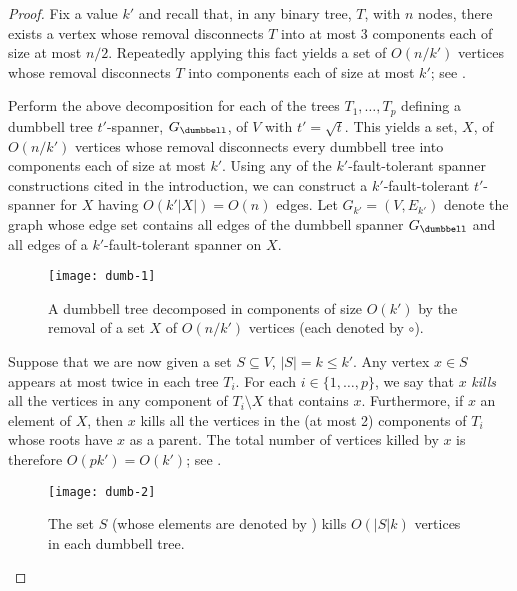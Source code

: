 \documentclass{patmorin}
\begin{document}
\begin{proof} 
  Fix a value $k'$ and recall that, in any binary tree, $T$, with $n$
  nodes, there exists a vertex whose removal disconnects $T$ into at
  most 3 components each of size at most $n/2$.  Repeatedly applying this
  fact yields a set of $O(n/k')$ vertices whose removal disconnects $T$
  into components each of size at most $k'$; see .

  Perform the above decomposition for each of the trees $T_1,\ldots,T_p$
  defining a dumbbell tree $t'$-spanner, $G_\dumbbell$, of $V$ with
  $t'=\sqrt{t}$.  This yields a set, $X$, of $O(n/k')$ vertices
  whose removal disconnects every dumbbell tree into components
  each of size at most $k'$.  Using any of the $k'$-fault-tolerant
  spanner constructions cited in the introduction, we can construct a
  $k'$-fault-tolerant $t'$-spanner for $X$ having $O(k'|X|)=O(n)$ edges.
  Let $G_{k'}=(V,E_{k'})$ denote the graph whose edge set contains
  all edges of the dumbbell spanner $G_\dumbbell$ and all edges of a
  $k'$-fault-tolerant spanner on $X$.

  \begin{figure}
    \begin{center}
      \texttt{[image: dumb-1]}
    \end{center}
    \caption{A dumbbell tree decomposed in components of size $O(k')$
    by the removal of a set $X$ of $O(n/k')$ vertices (each denoted
    by $\circ$).}
  \end{figure}
  
  Suppose that we are now given a set $S\subseteq V$, $|S|=k\le k'$.
  Any vertex $x\in S$ appears at most twice in each tree $T_i$.  For each
  $i\in\{1,\ldots,p\}$, we say that $x$ \emph{kills} all the vertices
  in any component of $T_i\setminus X$ that contains $x$.  Furthermore,
  if $x$ an element of $X$, then $x$ kills all the vertices in the
  (at most 2) components of $T_i$ whose roots have $x$ as a parent.
  The total number of vertices killed by $x$ is therefore $O(pk')=O(k')$;
  see .

  \begin{figure}
    \begin{center}
      \texttt{[image: dumb-2]}
    \end{center}
    \caption{The set $S$ (whose elements are denoted by \textbullet) kills
      $O(|S|k)$ vertices in each dumbbell tree.}
  \end{figure}
  

\end{proof}
\end{document}
